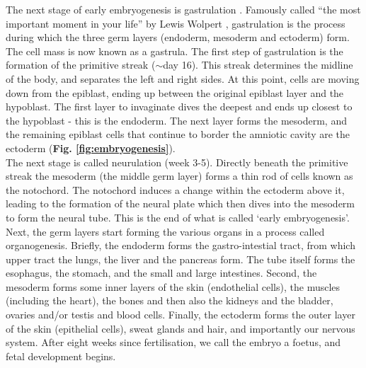 The next stage of early embryogenesis is gastrulation \cite{sheng2015epiblast}.
Famously called “the most important moment in your life” by Lewis Wolpert \cite{wolpert2015interview}, gastrulation is the process during which the three germ layers (endoderm, mesoderm and ectoderm) form.
The cell mass is now known as a gastrula.
The first step of gastrulation is the formation of the primitive streak ($\sim$day 16).
This streak determines the midline of the body, and separates the left and right sides.
At this point, cells are moving down from the epiblast, ending up between the original epiblast layer and the hypoblast.
The first layer to invaginate dives the deepest and ends up closest to the hypoblast - this is the endoderm.
The next layer forms the mesoderm, and the remaining epiblast cells that continue to border the amniotic cavity are the ectoderm (\textbf{Fig. \ref{fig:embryogenesis}}).\\

The next stage is called neurulation (week 3-5).
Directly beneath the primitive streak the mesoderm (the middle germ layer) forms a thin rod of cells known as the notochord.
The notochord induces a change within the ectoderm above it, leading to the formation of the neural plate which then dives into the mesoderm to form the neural tube.
This is the end of what is called `early embryogenesis'.\\

Next, the germ layers start forming the various organs in a process called organogenesis.
Briefly, the endoderm forms the gastro-intestial tract, from which upper tract the lungs, the liver and the pancreas form. 
The tube itself forms the esophagus, the stomach, and the small and large intestines.
Second, the mesoderm forms some inner layers of the skin (endothelial cells), the muscles (including the heart), the bones and then also the kidneys and the bladder, ovaries and/or testis and blood cells.
Finally, the ectoderm forms the outer layer of the skin (epithelial cells), sweat glands and hair, and importantly our nervous system.
After eight weeks since fertilisation, we call the embryo a foetus, and fetal development begins.




